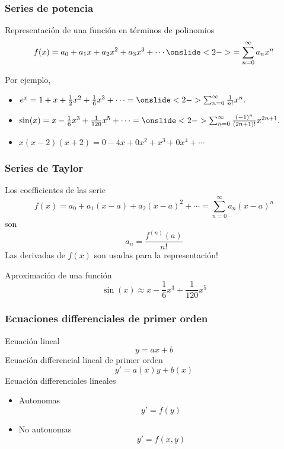 \documentclass{beamer}
\begin{document}
\begin{frame}
\frametitle{Series de potencia}
Representación de una función en términos de polinomios
\[f(x)=a_{0}+a_{1}x+a_{2}x^{2}+a_{3}x^{3}+\cdots \onslide<2->{=\sum_{n=0}^{\infty}a_{n}x^{n}}\]

Por ejemplo,
\begin{itemize}
 \item $e^{x} = 1+x+\frac{1}{2}x^{2}+\frac{1}{6}x^{3}+\cdots = \onslide<2->{\sum_{n=0}^{\infty}\frac{1}{n!}x^{n}}.$
 \item $\sin(x) = x-\frac{1}{6}x^{3}+\frac{1}{120}x^{5}+\cdots = \onslide<2->{\sum_{n=0}^{\infty}\frac{(-1)^{n}}{(2n+1)!}x^{2n+1}}.$
 \item $x(x-2)(x+2)=0-4x+0x^{2}+x^{3}+0x^{4}+\cdots$
\end{itemize}

\vspace{10pt}
\end{frame}
\begin{frame}
\frametitle{Series de Taylor}
Los coefficientes de las serie
\[f(x)=a_{0}+a_{1}(x-a)+a_{2}(x-a)^{2}+\cdots =\sum_{n=0}^{\infty}a_{n}(x-a)^{n}\]
son
\[a_{n}=\frac{f^{(n)}(a)}{n!}\]
Las derivadas de $f(x)$ son usadas para la representación!
\pause

\vspace{10pt}
Aproximación de una función
\[\sin(x) \approx x-\frac{1}{6}x^{3}+\frac{1}{120}x^{5}\]
\end{frame}
\begin{frame}
\frametitle{Ecuaciones differenciales de primer orden}
Ecuación lineal
\[y=ax+b\]
Ecuación differencial lineal de primer orden
\[y'=a(x)y+b(x)\]
\pause
Ecuación differenciales lineales
\begin{itemize}
    \item Autonomas \[y'=f(y)\]
    \item No autonomas \[y'=f(x,y)\]
\end{itemize}


\end{frame}
\end{document}
